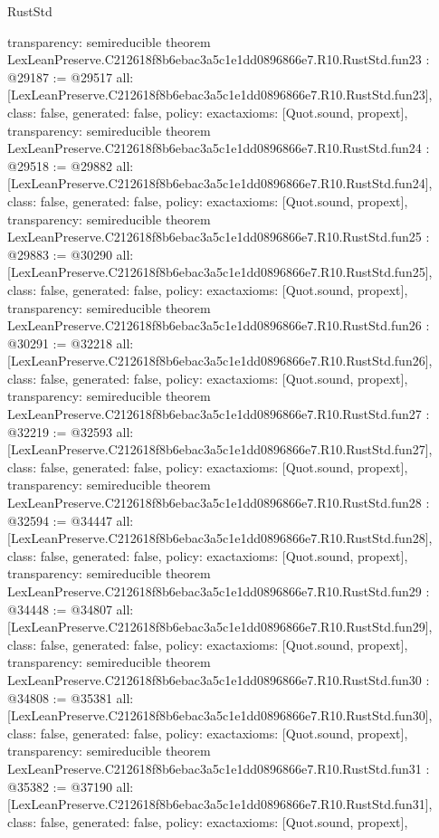 \begin{lexlean}{RustStd}
\begin{coremodule}
{  transparency: semireducible
}
theorem LexLeanPreserve.C212618f8b6ebac3a5c1e1dd0896866e7.R10.RustStd.fun23 : @29187 := @29517 {
  all: [LexLeanPreserve.C212618f8b6ebac3a5c1e1dd0896866e7.R10.RustStd.fun23],
  class: false,
  generated: false,
  policy: exact{axioms: [Quot.sound, propext]},
  transparency: semireducible
}
theorem LexLeanPreserve.C212618f8b6ebac3a5c1e1dd0896866e7.R10.RustStd.fun24 : @29518 := @29882 {
  all: [LexLeanPreserve.C212618f8b6ebac3a5c1e1dd0896866e7.R10.RustStd.fun24],
  class: false,
  generated: false,
  policy: exact{axioms: [Quot.sound, propext]},
  transparency: semireducible
}
theorem LexLeanPreserve.C212618f8b6ebac3a5c1e1dd0896866e7.R10.RustStd.fun25 : @29883 := @30290 {
  all: [LexLeanPreserve.C212618f8b6ebac3a5c1e1dd0896866e7.R10.RustStd.fun25],
  class: false,
  generated: false,
  policy: exact{axioms: [Quot.sound, propext]},
  transparency: semireducible
}
theorem LexLeanPreserve.C212618f8b6ebac3a5c1e1dd0896866e7.R10.RustStd.fun26 : @30291 := @32218 {
  all: [LexLeanPreserve.C212618f8b6ebac3a5c1e1dd0896866e7.R10.RustStd.fun26],
  class: false,
  generated: false,
  policy: exact{axioms: [Quot.sound, propext]},
  transparency: semireducible
}
theorem LexLeanPreserve.C212618f8b6ebac3a5c1e1dd0896866e7.R10.RustStd.fun27 : @32219 := @32593 {
  all: [LexLeanPreserve.C212618f8b6ebac3a5c1e1dd0896866e7.R10.RustStd.fun27],
  class: false,
  generated: false,
  policy: exact{axioms: [Quot.sound, propext]},
  transparency: semireducible
}
theorem LexLeanPreserve.C212618f8b6ebac3a5c1e1dd0896866e7.R10.RustStd.fun28 : @32594 := @34447 {
  all: [LexLeanPreserve.C212618f8b6ebac3a5c1e1dd0896866e7.R10.RustStd.fun28],
  class: false,
  generated: false,
  policy: exact{axioms: [Quot.sound, propext]},
  transparency: semireducible
}
theorem LexLeanPreserve.C212618f8b6ebac3a5c1e1dd0896866e7.R10.RustStd.fun29 : @34448 := @34807 {
  all: [LexLeanPreserve.C212618f8b6ebac3a5c1e1dd0896866e7.R10.RustStd.fun29],
  class: false,
  generated: false,
  policy: exact{axioms: [Quot.sound, propext]},
  transparency: semireducible
}
theorem LexLeanPreserve.C212618f8b6ebac3a5c1e1dd0896866e7.R10.RustStd.fun30 : @34808 := @35381 {
  all: [LexLeanPreserve.C212618f8b6ebac3a5c1e1dd0896866e7.R10.RustStd.fun30],
  class: false,
  generated: false,
  policy: exact{axioms: [Quot.sound, propext]},
  transparency: semireducible
}
theorem LexLeanPreserve.C212618f8b6ebac3a5c1e1dd0896866e7.R10.RustStd.fun31 : @35382 := @37190 {
  all: [LexLeanPreserve.C212618f8b6ebac3a5c1e1dd0896866e7.R10.RustStd.fun31],
  class: false,
  generated: false,
  policy: exact{axioms: [Quot.sound, propext]},
}
\end{coremodule}
\end{lexlean}
